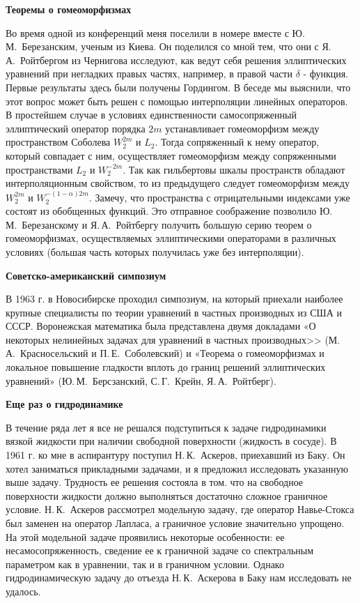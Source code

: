 {\bf Теоремы о гомеоморфизмах}

Во время одной из конференций меня поселили в номере вместе с Ю.\,М.~Березанским, ученым из Киева. Он поделился со мной тем, что они с Я.\,А.~Ройтбергом из Чернигова исследуют, как ведут себя решения эллиптических уравнений при негладких правых частях, например, в правой части $\delta$ - функция. Первые результаты здесь были получены Гордингом. В беседе мы выяснили, что этот вопрос может быть решен с помощью интерполяции линейных операторов. В простейшем случае в условиях единственности самосопряженный эллиптический оператор порядка $2m$ устанавливает гомеоморфизм между пространством Соболева $W_2^{2m}$ и $L_2$. Тогда сопряженный к нему оператор, который совпадает с ним, осуществляет гомеоморфизм между сопряженными пространствами $L_2$ и $W_2^{-2m}$. Так как гильбертовы шкалы пространств обладают интерполяционным свойством, то из предыдущего следует гомеоморфизм между $W_2^{2m}$ и $W_2^{-(1-\alpha)2m}$. Замечу, что пространства с отрицательными индексами уже состоят из обобщенных функций. Это отправное соображение позволило Ю.\,М.~Березанскому и Я.\,А.~Ройтбергу получить большую серию теорем о гомеоморфизмах, осуществляемых эллиптическими операторами в различных условиях (большая часть которых получилась уже без интерполяции).

{\bf Советско-американский симпозиум}

В 1963 г. в Новосибирске проходил симпозиум,
на который приехали наиболее крупные специалисты по теории уравнений в частных производных из США и СССР.
Воронежская математика была представлена двумя докладами «О некоторых нелинейных задачах для уравнений в частных производных>>
(М.\,А.~Красносельский и П.\,Е.~Соболевский) и «Теорема о гомеоморфизмах и локальное повышение гладкости вплоть до границ решений эллиптических уравнений»
 (Ю.\,М.~Берсзанский, С.\,Г.~Крейн, Я.\,А.~Ройтберг).

{\bf Еще раз о гидродинамике}

В течение ряда лет я все не решался подступиться к задаче гидродинамики вязкой жидкости при наличии свободной поверхности (жидкость в сосуде). В 1961 г. ко мне в аспирантуру поступил Н.\,К.~Аскеров, приехавший из Баку. Он хотел заниматься прикладными задачами, и я предложил исследовать указанную выше задачу. Трудность ее решения состояла в том. что на свободное поверхности жидкости должно выполняться достаточно сложное граничное условие. Н.\,К.~Аскеров рассмотрел модельную задачу, где оператор Навье-Стокса был заменен на оператор Лапласа, а граничное условие значительно упрощено. На этой модельной задаче проявились некоторые особенности: ее несамосопряженность, сведение ее к граничной задаче со спектральным параметром как в уравнении, так и в граничном условии. Однако гидродинамическую задачу до отъезда Н.\,К.~Аскерова в Баку нам исследовать не удалось.

